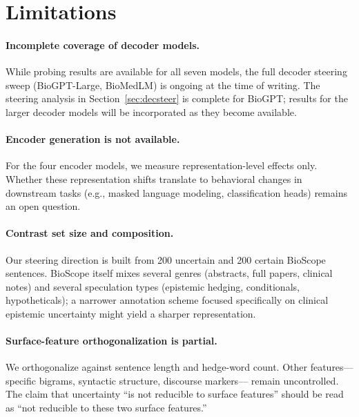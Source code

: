 \documentclass[11pt,a4paper]{article}
\begin{document}
\section{Limitations}

\paragraph{Incomplete coverage of decoder models.}
While probing results are available for all seven models, the full
decoder steering sweep (BioGPT-Large, BioMedLM) is ongoing at the time
of writing. The steering analysis in Section~\ref{sec:decsteer} is
complete for BioGPT; results for the larger decoder models will be
incorporated as they become available.

\paragraph{Encoder generation is not available.}
For the four encoder models, we measure representation-level effects
only. Whether these representation shifts translate to behavioral changes
in downstream tasks (e.g., masked language modeling, classification heads)
remains an open question.

\paragraph{Contrast set size and composition.}
Our steering direction is built from 200 uncertain and 200 certain
BioScope sentences. BioScope itself mixes several genres (abstracts, full
papers, clinical notes) and several speculation types (epistemic hedging,
conditionals, hypotheticals); a narrower annotation scheme focused
specifically on clinical epistemic uncertainty might yield a sharper
representation.

\paragraph{Surface-feature orthogonalization is partial.}
We orthogonalize against sentence length and hedge-word count. Other
features---specific bigrams, syntactic structure, discourse markers---
remain uncontrolled. The claim that uncertainty ``is not reducible to
surface features'' should be read as ``not reducible to these two
surface features.''
\end{document}
